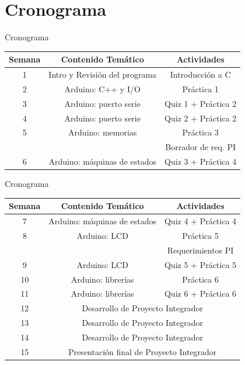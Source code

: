 \documentclass[handout,xcolor=dvipsnames]{beamer}
\newcommand{\pageframe}[1]{\frame{\begin{center}{ \Huge #1 }\end{center}}}
\begin{document}
\section{Cronograma}

\pageframe{Cronograma}

\begin{frame}{Cronograma}
 \begin{center}
 {\small
  \begin{tabular}{|c|c|c|}\hline

   Semana 	& \multicolumn{1}{c|}{Contenido Temático} & \multicolumn{1}{c|}{Actividades} \\ \hline \hline
   1 		& Intro y Revisión del programa & Introducción a C\\ \hline
   2 		& Arduino: C++ y I/O   		& Práctica 1 \\ \hline
   3 		& Arduino: puerto serie		& Quiz 1 + Práctica 2 \\ \hline
   4 		& Arduino: puerto serie		& Quiz 2 + Práctica 2  \\ \hline
   5		& Arduino: memorias   		& Práctica 3  \\ 
    		& 							& Borrador de req. PI  \\ \hline
   6 		& Arduino: máquinas de estados	& Quiz 3 + Práctica 4  \\ \hline



  \end{tabular}}
 \end{center}
\end{frame}

\begin{frame}{Cronograma}
 \begin{center}
 {\small
  \begin{tabular}{|c|c|c|}\hline
   Semana 	& \multicolumn{1}{c|}{Contenido Temático} & \multicolumn{1}{c|}{Actividades} \\ \hline \hline
   7 		& Arduino: máquinas de estados	 & Quiz 4 + Práctica 4 \\ \hline
   8 		& Arduino: LCD					 & Práctica 5 \\
    		& 							& Requerimientos PI  \\ \hline
   9 		& Arduino: LCD      		     &  Quiz 5 + Práctica 5 \\ \hline

   10 		& Arduino: librerías			& Práctica 6  \\ \hline
   11		& Arduino: librerías	& Quiz 6 + Práctica 6  \\ \hline
   12 		& \multicolumn{2}{c|}{Desarrollo de Proyecto Integrador}  \\ \hline
   13 		& \multicolumn{2}{c|}{Desarrollo de Proyecto Integrador}  \\ \hline
   14		& \multicolumn{2}{c|}{Desarrollo de Proyecto Integrador}  \\ \hline
   15 		& \multicolumn{2}{c|}{Presentación final de Proyecto Integrador}  \\ \hline
  \end{tabular}}
 \end{center}
\end{frame}
\end{document}
